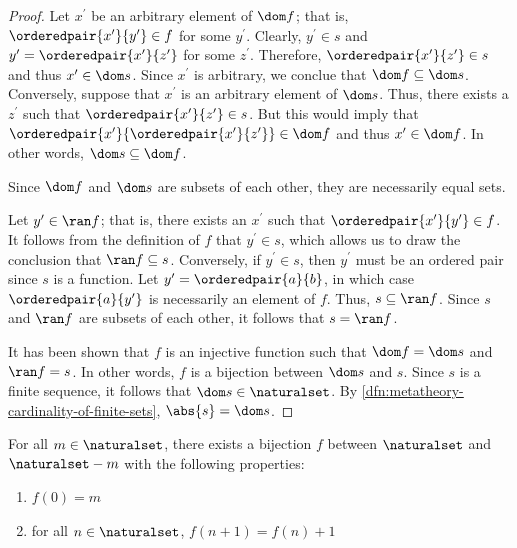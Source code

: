 \begin{proof}
    \vspace{0.3cm}
    \noindent
    Let \( x^{\prime} \) be an arbitrary element of \( \dom f \); that is, \( \orderedpair{x^{\prime}}{y^{\prime}} \in f \) for some \( y^{\prime} \).
    Clearly, \( y^{\prime} \in s \) and \( y^{\prime} = \orderedpair{x^{\prime}}{z^{\prime}} \) for some \( z^{\prime} \).
    Therefore, \( \orderedpair{x^{\prime}}{z^{\prime}} \in s \) and thus \( x^{\prime} \in \dom s \).
    Since \( x^{\prime} \) is arbitrary, we conclue that \( \dom f \subseteq \dom s \).
    Conversely, suppose that \( x^{\prime} \) is an arbitrary element of \( \dom s \).
    Thus, there exists a \( z^{\prime} \) such that \( \orderedpair{x^{\prime}}{z^{\prime}} \in s \).
    But this would imply that \( \orderedpair{x^{\prime}}{\orderedpair{x^{\prime}}{z^{\prime}}} \in \dom f \) and thus \( x^{\prime} \in \dom f \).
    In other words, \( \dom s \subseteq \dom f \).

    \vspace{0.3cm}
    \noindent
    Since \( \dom f \) and \( \dom s \) are subsets of each other, they are necessarily equal sets.

    \vspace{0.3cm}
    \noindent
    Let \( y^{\prime} \in \ran f \); that is, there exists an \( x^{\prime} \) such that \( \orderedpair{x^{\prime}}{y^{\prime}} \in f \).
    It follows from the definition of \( f \) that \( y^{\prime} \in s \), which allows us to draw the conclusion that \( \ran f \subseteq s \).
    Conversely, if \( y^{\prime} \in s \), then \( y^{\prime} \) must be an ordered pair since \( s \) is a function.
    Let \( y^{\prime} = \orderedpair{a}{b} \), in which case \( \orderedpair{a}{y^{\prime}} \) is necessarily an element of \( f \).
    Thus, \( s \subseteq \ran f \).
    Since \( s \) and \( \ran f \) are subsets of each other, it follows that \( s = \ran f \).

    \vspace{0.3cm}
    \noindent
    It has been shown that \( f \) is an injective function such that \( \dom f = \dom s \) and \( \ran f = s \).
    In other words, \( f \) is a bijection between \( \dom s \) and \( s \).
    Since \( s \) is a finite sequence, it follows that \( \dom s \in \naturalset \).
    By \cref{dfn:metatheory-cardinality-of-finite-sets}, \( \abs{s} = \dom s \).
\end{proof}

\begin{thm}
     \label{thm:metatheory-a-bijection-exists-between-N-and-N-minus-n-where-n-is-an-element-of-N}
    For all \( m \in \naturalset \), there exists a bijection \( f \) between \( \naturalset \) and \( \naturalset - m \) with the
    following properties:
    \begin{enumerate}[topsep=2pt,label=\textup{\texttt{(\alph*)}}]
        \item \( f(0) = m \)
        \item for all \( n \in \naturalset \), \( f(n + 1) = f(n) + 1 \)
    \end{enumerate}
\end{thm}

